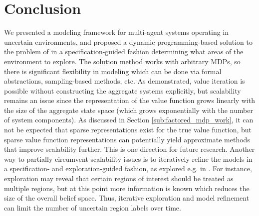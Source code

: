 \documentclass[conference]{IEEEtran}
\renewcommand{\cite}[1]{\citep{#1}}
\begin{document}


\section{Conclusion}
\label{sec:conclusion}

We presented a modeling framework for multi-agent systems operating in uncertain environments, and proposed a dynamic programming-based solution to the problem of in a specification-guided fashion determining what areas of the environment to explore. The solution method works with arbitrary MDPs, so there is significant flexibility in modeling which can be done via formal abstractions, sampling-based methods, etc. As demonstrated, value iteration is possible without constructing the aggregate systems explicitly, but scalability remains an issue since the representation of the value function grows linearly with the size of the aggregate state space (which grows exponentially with the number of system components). As discussed in Section \ref{sub:factored_mdp_work}, it can not be expected that sparse representations exist for the true value function, but sparse value function representations can potentially yield approximate methods that improve scalability further. This is one direction for future research. Another way to partially circumvent scalability issues is to iteratively refine the models in a specification- and exploration-guided fashion, as explored e.g. in \cite{Nilsson2017}. For instance, exploration may reveal that certain regions of interest should be treated as multiple regions, but at this point more information is known which reduces the size of the overall belief space. Thus, iterative exploration and model refinement can limit the number of uncertain region labels over time.  





\end{document}
